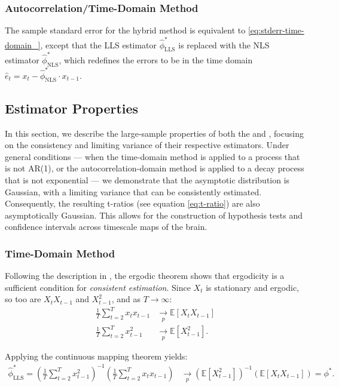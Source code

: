 \documentclass[main.tex]{subfiles}
\begin{document}
\subsubsection{Autocorrelation/Time-Domain Method}\label{sec:stderr-autocorrelation/time-domain_}
The sample standard error for the hybrid method is equivalent to \eqref{eq:stderr-time-domain_}, except that the LLS estimator $\hat\phi^*_{\scriptscriptstyle\text{LLS}}$ is replaced with the NLS estimator $\hat\phi^*_{\scriptscriptstyle\text{NLS}}$, which redefines the errors to be in the time domain $\hat e_t = x_t - \hat\phi^*_{\scriptscriptstyle\text{NLS}} \cdot x_{t-1}$.

\subsection{Estimator Properties}\label{sec:estimator-properties}
In this section, we describe the large-sample properties of both the  and , focusing on the consistency and limiting variance of their respective estimators. Under general conditions --- when the time-domain method is applied to a process that is not AR(1), or the autocorrelation-domain method is applied to a decay process that is not exponential --- we demonstrate that the asymptotic distribution is Gaussian, with a limiting variance that can be consistently estimated. Consequently, the resulting t-ratios (see equation \eqref{eq:t-ratio}) are also asymptotically Gaussian. This allows for the construction of hypothesis tests and confidence intervals across timescale maps of the brain.

\subsubsection{Time-Domain Method}
Following the description in \citet[Theorem~14.29]{hansen_econometrics_2022}, the ergodic theorem shows that ergodicity is a sufficient condition for \textit{consistent estimation}. Since $X_t$ is stationary and ergodic, so too are $X_t X_{t-1}$ and $X_{t-1}^2$, and as $T \to \infty$:
\begin{align}
    \frac{1}{T} \sum_{t=2}^T x_t x_{t-1} &\underset{p}{\to} \mathbb{E}[X_t X_{t-1}]\\
    \frac{1}{T} \sum_{t=2}^T x_{t-1}^2 &\underset{p}{\to} \mathbb{E}[X_{t-1}^2].
\end{align}

\noindent Applying the continuous mapping theorem yields:
\begin{align}
    \hat\phi^*_{\scriptscriptstyle\text{LLS}} = \left(\frac{1}{T} \sum_{t=2}^T x_{t-1}^2\right)^{-1} \left( \frac{1}{T} \sum_{t=2}^T x_t x_{t-1}\right) &\underset{p}{\to} (\mathbb{E}[X_{t-1}^2])^{-1}(\mathbb{E}[X_t X_{t-1}]) = \phi^*.
\end{align}
\end{document}
